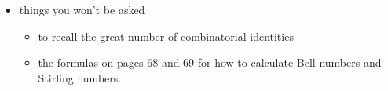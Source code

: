 \documentclass[11pt]{article}
\begin{document}
\begin{itemize}
\item things you won't be asked
	\begin{itemize}
	\item to recall the great number of combinatorial identities
	\item the formulas on pages 68 and 69 for how to calculate Bell numbers and  Stirling numbers.
	\end{itemize}
\end{itemize}
\end{document}
